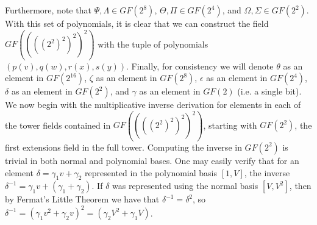 
Furthermore, note that $\Psi, \Lambda \in GF(2^8)$, $\Theta, \Pi \in GF(2^4)$, and $\Omega, \Sigma \in GF(2^2)$. With this set of polynomials, it is clear that we can construct the field $GF((((2^2)^2)^2)^2)$ with the tuple of polynomials $(p(v), q(w), r(x), s(y))$. Finally, for consistency we will denote $\theta$ as an element in $GF(2^{16})$, $\zeta$ as an element in $GF(2^8)$, $\epsilon$ as an element in $GF(2^4)$, $\delta$ as an element in $GF(2^2)$, and $\gamma$ as an element in $GF(2)$ (i.e. a single bit). We now begin with the multiplicative inverse derivation for elements in each of the tower fields contained in $GF((((2^2)^2)^2)^2)$, starting with $GF(2^2)$, the first extensions field in the full tower. Computing the inverse in $GF(2^2)$ is trivial in both normal and polynomial bases. One may easily verify that for an element $\delta = \gamma_1 v + \gamma_2$ represented in the polynomial basis $[1,V]$, the inverse $\delta^{-1} = \gamma_1 v + (\gamma_1 + \gamma_2)$. If $\delta$ was represented using the normal basis $[V,V^2]$, then by Fermat's Little Theorem we have that $\delta^{-1} = \delta^2$, so $\delta^{-1} = (\gamma_1 v^2 + \gamma_2v)^2 = (\gamma_2 V^2 + \gamma_1V)$.

